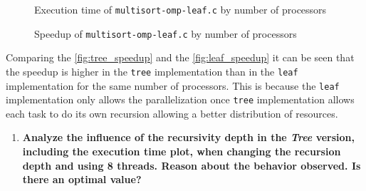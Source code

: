\documentclass[a4paper]{article}
\newenvironment{questionenum}{%
\setlist[enumerate]{resume}
\restartlist{enumerate}
\newcommand{\question}[1]{
\begin{enumerate}
	\item\bfseries ##1
\end{enumerate}
}}{%
}
\begin{document}
\begin{questionenum}
    \begin{figure}[H]
        \centering
        \begin{minipage}[t]{0.49\textwidth}
            \caption{Execution time of \texttt{multisort-omp-leaf.c} by number of processors}
            \label{fig:leaf_time}
        \end{minipage}
        \hfill
        \begin{minipage}[t]{0.49\textwidth}
            \caption{Speedup of \texttt{multisort-omp-leaf.c} by number of processors}
            \label{fig:leaf_speedup}
        \end{minipage}
    \end{figure}
    
    Comparing the \autoref{fig:tree_speedup} and the \autoref{fig:leaf_speedup} it can be seen that the speedup is higher in the \texttt{tree} implementation than in the \texttt{leaf} implementation for the same number of processors. This is because the \texttt{leaf} implementation only allows the parallelization once \texttt{tree} implementation allows each task to do its own recursion allowing a better distribution of resources.
    
	\question{Analyze the influence of the recursivity depth in the \textit{Tree} version, including the execution time plot, when changing the recursion depth and using 8 threads. Reason about the behavior observed. Is there an optimal value?}
    

\end{questionenum}
\end{document}
